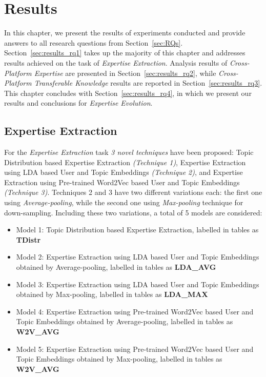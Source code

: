 \chapter{Results\label{chap:result}}

    In this chapter, we present the results of experiments conducted and provide answers to all research questions from Section~\ref{sec:RQs}. Section~\ref{sec:results_rq1} takes up the majority of this chapter and addresses results achieved on the task of \emph{Expertise Extraction}. Analysis results of \emph{Cross-Platform Expertise} are presented in Section~\ref{sec:results_rq2}, while \emph{Cross-Platform Transferable Knowledge} results are reported in Section~\ref{sec:results_rq3}. This chapter concludes with Section~\ref{sec:results_rq4}, in which we present our results and conclusions for \emph{Expertise Evolution}.

    \section{Expertise Extraction\label{sec:results_rq1}}
        
        For the \emph{Expertise Extraction} task \emph{3 novel techniques} have been proposed: Topic Distribution based Expertise Extraction \emph{(Technique 1)}, Expertise Extraction using LDA based User and Topic Embeddings \emph{(Technique 2)}, and Expertise Extraction using Pre-trained Word2Vec based User and Topic Embeddings \emph{(Technique 3)}. Techniques 2 and 3 have two different variations each: the first one using \emph{Average-pooling}, while the second one using \emph{Max-pooling} technique for down-sampling. Including these two variations, a total of 5 models are considered:
        
        \begin{itemize}
            \item Model 1: Topic Distribution based Expertise Extraction, labelled in tables as \textbf{TDistr}
            \item Model 2: Expertise Extraction using LDA based User and Topic Embeddings obtained by Average-pooling, labelled in tables as \textbf{LDA\_AVG}
            \item Model 3: Expertise Extraction using LDA based User and Topic Embeddings obtained by Max-pooling, labelled in tables as \textbf{LDA\_MAX}
            \item Model 4: Expertise Extraction using Pre-trained Word2Vec based User and Topic Embeddings obtained by Average-pooling, labelled in tables as \textbf{W2V\_AVG} 
            \item Model 5: Expertise Extraction using Pre-trained Word2Vec based User and Topic Embeddings obtained by Max-pooling, labelled in tables as \textbf{W2V\_AVG} 
        \end{itemize}
        
